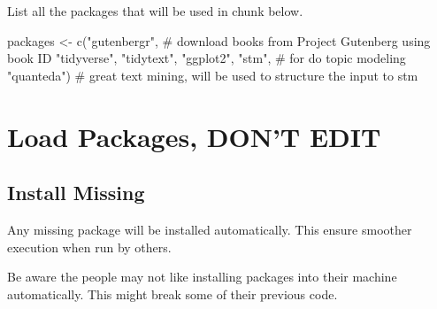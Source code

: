 \documentclass[
  letterpaper,
  DIV=11,
  numbers=noendperiod]{scrreprt}
\newenvironment{Shaded}{\begin{snugshade}}{\end{snugshade}}
\newcommand{\CommentTok}[1]{\textcolor[rgb]{0.37,0.37,0.37}{#1}}
\newcommand{\FunctionTok}[1]{\textcolor[rgb]{0.28,0.35,0.67}{#1}}
\newcommand{\NormalTok}[1]{\textcolor[rgb]{0.00,0.23,0.31}{#1}}
\newcommand{\OtherTok}[1]{\textcolor[rgb]{0.00,0.23,0.31}{#1}}
\newcommand{\StringTok}[1]{\textcolor[rgb]{0.13,0.47,0.30}{#1}}
\begin{document}

List all the packages that will be used in chunk below.

\begin{Shaded}
\begin{Highlighting}[]
\NormalTok{packages }\OtherTok{\textless{}{-}} \FunctionTok{c}\NormalTok{(}\StringTok{"gutenbergr"}\NormalTok{, }\CommentTok{\# download books from Project Gutenberg using book ID}
              \StringTok{"tidyverse"}\NormalTok{,}
              \StringTok{"tidytext"}\NormalTok{,}
              \StringTok{"ggplot2"}\NormalTok{,}
              \StringTok{"stm"}\NormalTok{, }\CommentTok{\# for do topic modeling}
              \StringTok{"quanteda"}\NormalTok{) }\CommentTok{\# great text mining, will be used to structure the input to stm}
\end{Highlighting}
\end{Shaded}

\section*{Load Packages, DON'T EDIT}\label{sec-packages}


\subsection*{Install Missing}\label{install-missing-9}

Any missing package will be installed automatically. This ensure
smoother execution when run by others.

\begin{tcolorbox}[enhanced jigsaw, toptitle=1mm, rightrule=.15mm, opacityback=0, colbacktitle=quarto-callout-important-color!10!white, colframe=quarto-callout-important-color-frame, left=2mm, leftrule=.75mm, toprule=.15mm, arc=.35mm, opacitybacktitle=0.6, coltitle=black, breakable, bottomtitle=1mm, bottomrule=.15mm, title=\textcolor{quarto-callout-important-color}{\faExclamation}\hspace{0.5em}{Installing Packages on Other People Machine}, titlerule=0mm, colback=white]

Be aware the people may not like installing packages into their machine
automatically. This might break some of their previous code.

\end{tcolorbox}
\end{document}
